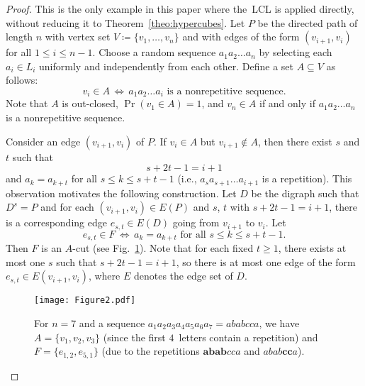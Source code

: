 \documentclass[10pt]{article}
\numberwithin{equation}{subsection}
\theoremstyle{definition}
\begin{document}
	\begin{proof}
		This is the only example in this paper where the~LCL is applied directly, without reducing it to Theorem~\ref{theo:hypercubes}. Let $P$ be the directed path of length $n$ with vertex set $V \coloneqq \{v_1, \ldots, v_n\}$ and with edges of the form $(v_{i+1}, v_i)$ for all $1 \leq i \leq n-1$. Choose a random sequence $a_1a_2\ldots a_n$ by selecting each $a_i \in L_i$ uniformly and independently from each other.
		Define a set $A \subseteq V$ as follows:
		$$
			v_i \in A \,\Longleftrightarrow\, \text{$a_1a_2\ldots a_i$ is a nonrepetitive sequence}.
		$$
		Note that $A$ is out-closed, $\Pr(v_1 \in A) = 1$, and $v_n \in A$ if and only if $a_1a_2\ldots a_n$ is a nonrepetitive sequence.
		
		Consider an edge $(v_{i+1}, v_i)$ of $P$. If $v_i \in A$ but $v_{i+1} \not \in A$, then there exist $s$ and $t$ such that
		$$
			s+2t-1 = i+1
		$$
		and $a_k = a_{k+t}$ for all $s \leq k \leq s+t-1$ (i.e., $a_s a_{s+1} \ldots a_{i+1}$ is a repetition). This observation motivates the following construction. Let $D$ be the digraph such that $D^s = P$ and for each $(v_{i+1}, v_i) \in E(P)$ and $s$, $t$ with $s+2t-1=i+1$, there is a corresponding edge $e_{s,t} \in E(D)$ going from $v_{i+1}$ to $v_i$. Let
		$$
			e_{s,t} \in F\,\Longleftrightarrow\, \text{$a_k = a_{k+t}$ for all $s \leq k \leq s+t-1$}.
		$$
		Then $F$ is an $A$-cut (see Fig.~\ref{fig:path}). Note that for each fixed $t \geq 1$, there exists at most one $s$ such that $s+2t-1 = i+1$, so there is at most one edge of the form $e_{s,t} \in E(v_{i+1}, v_i)$, where $E$ denotes the edge set of $D$.
		
		\begin{figure}[h]
			\begin{mdframed}[linewidth=0.5pt]
			\centering
			\texttt{[image: Figure2.pdf]}
			\caption{\label{fig:path} For $n = 7$ and a sequence $a_1 a_2 a_3 a_4 a_5 a_6 a_7 = ababcca$, we have $A = \{v_1, v_2, v_3\}$ (since the first $4$~letters contain a repetition) and $F = \{e_{1, 2}, e_{5,1}\}$ (due to the repetitions $\pmb{abab}cca$ and $abab\pmb{cc}a$).
				}
			\end{mdframed}
		\end{figure}
		

\end{proof}
\end{document}
